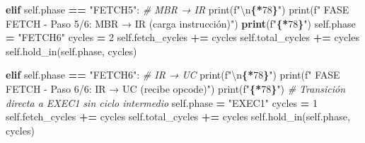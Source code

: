 \documentclass[12pt,oneside]{templates/unerthesis}
\newenvironment{Shaded}{\begin{snugshade}}{\end{snugshade}}
\newcommand{\BuiltInTok}[1]{#1}
\newcommand{\CharTok}[1]{\textcolor[rgb]{0.31,0.60,0.02}{#1}}
\newcommand{\CommentTok}[1]{\textcolor[rgb]{0.56,0.35,0.01}{\textit{#1}}}
\newcommand{\ControlFlowTok}[1]{\textcolor[rgb]{0.13,0.29,0.53}{\textbf{#1}}}
\newcommand{\DecValTok}[1]{\textcolor[rgb]{0.00,0.00,0.81}{#1}}
\newcommand{\ErrorTok}[1]{\textcolor[rgb]{0.64,0.00,0.00}{\textbf{#1}}}
\newcommand{\NormalTok}[1]{#1}
\newcommand{\OperatorTok}[1]{\textcolor[rgb]{0.81,0.36,0.00}{\textbf{#1}}}
\newcommand{\SpecialCharTok}[1]{\textcolor[rgb]{0.81,0.36,0.00}{\textbf{#1}}}
\newcommand{\SpecialStringTok}[1]{\textcolor[rgb]{0.31,0.60,0.02}{#1}}
\newcommand{\StringTok}[1]{\textcolor[rgb]{0.31,0.60,0.02}{#1}}
\newcommand{\VariableTok}[1]{\textcolor[rgb]{0.00,0.00,0.00}{#1}}
\begin{document}
\begin{Shaded}
\begin{Highlighting}[]
        \ControlFlowTok{elif} \VariableTok{self}\NormalTok{.phase }\OperatorTok{==} \StringTok{"FETCH5"}\NormalTok{:  }\CommentTok{\# MBR → IR}
            \BuiltInTok{print}\NormalTok{(}\SpecialStringTok{f"}\CharTok{\textbackslash{}n}\SpecialCharTok{\{}\StringTok{\textquotesingle{}{-}\textquotesingle{}}\OperatorTok{*}\DecValTok{78}\SpecialCharTok{\}}\SpecialStringTok{"}\NormalTok{)}
            \BuiltInTok{print}\NormalTok{(}\SpecialStringTok{f"  FASE FETCH {-} Paso 5/6: MBR → IR }
\ErrorTok{            }\NormalTok{(carga instrucción)}\StringTok{")}
\ErrorTok{            print}\NormalTok{(}\SpecialStringTok{f"}\SpecialCharTok{\{}\StringTok{\textquotesingle{}{-}\textquotesingle{}}\OperatorTok{*}\DecValTok{78}\SpecialCharTok{\}}\SpecialStringTok{"}\NormalTok{)}
            \VariableTok{self}\NormalTok{.phase }\OperatorTok{=} \StringTok{"FETCH6"}
\NormalTok{            cycles }\OperatorTok{=} \DecValTok{2}
            \VariableTok{self}\NormalTok{.fetch\_cycles }\OperatorTok{+=}\NormalTok{ cycles}
            \VariableTok{self}\NormalTok{.total\_cycles }\OperatorTok{+=}\NormalTok{ cycles}
            \VariableTok{self}\NormalTok{.hold\_in(}\VariableTok{self}\NormalTok{.phase, cycles)}
        
        \ControlFlowTok{elif} \VariableTok{self}\NormalTok{.phase }\OperatorTok{==} \StringTok{"FETCH6"}\NormalTok{:  }\CommentTok{\# IR → UC}
            \BuiltInTok{print}\NormalTok{(}\SpecialStringTok{f"}\CharTok{\textbackslash{}n}\SpecialCharTok{\{}\StringTok{\textquotesingle{}{-}\textquotesingle{}}\OperatorTok{*}\DecValTok{78}\SpecialCharTok{\}}\SpecialStringTok{"}\NormalTok{)}
            \BuiltInTok{print}\NormalTok{(}\SpecialStringTok{f"  FASE FETCH {-} Paso 6/6: IR → UC (recibe opcode)"}\NormalTok{)}
            \BuiltInTok{print}\NormalTok{(}\SpecialStringTok{f"}\SpecialCharTok{\{}\StringTok{\textquotesingle{}{-}\textquotesingle{}}\OperatorTok{*}\DecValTok{78}\SpecialCharTok{\}}\SpecialStringTok{"}\NormalTok{)}
            \CommentTok{\# Transición directa a EXEC1 sin ciclo intermedio}
            \VariableTok{self}\NormalTok{.phase }\OperatorTok{=} \StringTok{"EXEC1"}
\NormalTok{            cycles }\OperatorTok{=} \DecValTok{1}
            \VariableTok{self}\NormalTok{.fetch\_cycles }\OperatorTok{+=}\NormalTok{ cycles}
            \VariableTok{self}\NormalTok{.total\_cycles }\OperatorTok{+=}\NormalTok{ cycles}
            \VariableTok{self}\NormalTok{.hold\_in(}\VariableTok{self}\NormalTok{.phase, cycles)}
        

\end{Highlighting}
\end{Shaded}
\end{document}
